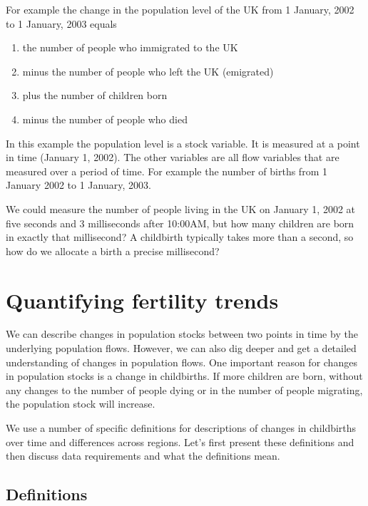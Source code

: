 \documentclass[
]{book}
\providecommand{\tightlist}{%
  \setlength{\itemsep}{0pt}\setlength{\parskip}{0pt}}
\begin{document}
For example the change in the population level of the UK from 1 January, 2002 to 1 January, 2003 equals

\begin{enumerate}
\def\labelenumi{\arabic{enumi}.}
\tightlist
\item
  the number of people who immigrated to the UK
\item
  minus the number of people who left the UK (emigrated)
\item
  plus the number of children born
\item
  minus the number of people who died
\end{enumerate}

In this example the population level is a stock variable. It is measured at a point in time (January 1, 2002). The other variables are all flow variables that are measured over a period of time. For example the number of births from 1 January 2002 to 1 January, 2003.

We could measure the number of people living in the UK on January 1, 2002 at five seconds and 3 milliseconds after 10:00AM, but how many children are born in exactly that millisecond? A childbirth typically takes more than a second, so how do we allocate a birth a precise millisecond?

\hypertarget{quantifying-fertility-trends}{%
\section{Quantifying fertility trends}\label{quantifying-fertility-trends}}

We can describe changes in population stocks between two points in time by the underlying population flows. However, we can also dig deeper and get a detailed understanding of changes in population flows. One important reason for changes in population stocks is a change in childbirths. If more children are born, without any changes to the number of people dying or in the number of people migrating, the population stock will increase.

We use a number of specific definitions for descriptions of changes in childbirths over time and differences across regions. Let's first present these definitions and then discuss data requirements and what the definitions mean.

\hypertarget{definitions}{%
\subsection{Definitions}\label{definitions}}
\end{document}
